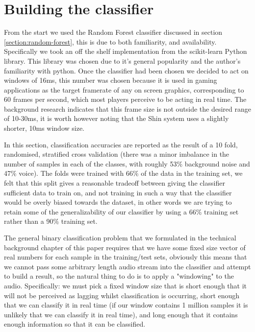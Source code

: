 \documentclass[ %
                    author={Sam Phippen},
                supervisor={Dr. Rafal Bogacz},
                     title={Real time voice activity detectors in noisy personal computing environments},
                  subtitle={},
                    degree={MEng},
                      year={2012} ]{thesis}
\begin{document}
\section{Building the classifier}

From the start we used the Random Forest classifier discussed in section
\ref{section:random-forest}, this is due to both familiarity, and availability.
Specifically we took an off the shelf implementation from the
scikit-learn\cite{sklearn} Python library. This library was chosen due to it's
general popularity and the author's familiarity with python. Once the
classifier had been chosen we decided to act on windows of 16ms, this number
was chosen because it is used in gaming applications as the target framerate of
any on screen graphics, corresponding to 60 frames per second, which most
players perceive to be acting in real time. The background research indicates
that this frame size is not outside the desired range of 10-30ms, it is worth
however noting that the Shin\cite{shin} system uses a slightly shorter, 10ms
window size.

In this section, classification accuracies are reported as the result of a 10
fold, randomised, stratified cross validation (there was a minor imbalance in
the number of samples in each of the classes, with roughly 53\% background
noise and 47\% voice). The folds were trained with 66\% of the data in the
training set, we felt that this split gives a reasonable tradeoff between
giving the classifier sufficient data to train on, and not training in such a
way that the classifier would be overly biased towards the dataset, in other
words we are trying to retain some of the generalizability of our classifier by
using a 66\% training set rather than a 90\% training set.

The general binary classification problem that we formulated in the technical
background chapter of this paper requires that we have some fixed size vector
of real numbers for each sample in the training/test sets, obviously this means
that we cannot pass some arbitrary length audio stream into the classifier and
attempt to build a result, so the natural thing to do is to apply a "windowing"
to the audio. Specifically: we must pick a fixed window size that is short
enough that it will not be perceived as lagging whilst classification is
occurring, short enough that we can classify it in real time (if our window
contains 1 million samples it is unlikely that we can classify it in real
time), and long enough that it contains enough information so that it can be
classified.
\end{document}

